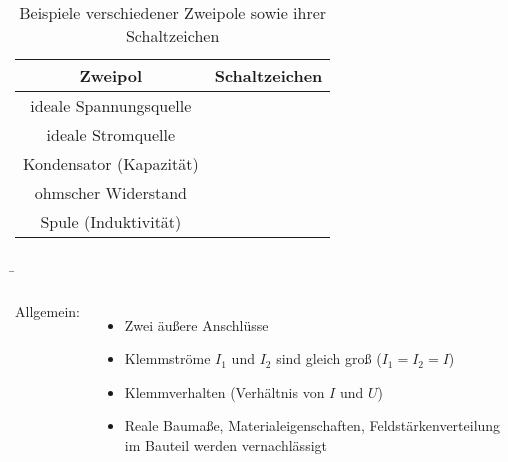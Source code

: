 \begin{frame}
{		\begin{center}
			\begin{table}[h!]
				\centering
				\begin{tabular}{|c|c|}
					\hline
					Zweipol                 & Schaltzeichen                                               \\ \hline
					ideale Spannungsquelle  &  \\ \hline
					ideale Stromquelle      &      \\ \hline
					Kondensator (Kapazität) &             \\ \hline
					ohmscher Widerstand     &     \\ \hline
					Spule (Induktivität)    &                   \\ \hline
				\end{tabular}
				\caption{Beispiele verschiedener Zweipole sowie ihrer Schaltzeichen}
				\label{tab:schaltzeichen}
			\end{table}
		\end{center}
	}
	
	\b{
	
		\begin{columns}
			
			Allgemein:\\
			\phantom{.}\\
			\begin{itemize}
				\item Zwei äußere Anschlüsse
				\item Klemmströme $I_1$ und $I_2$ sind gleich groß ($I_1=I_2 = I$)
				\item Klemmverhalten (Verhältnis von $I$ und $U$)
				\item Reale Baumaße, Materialeigenschaften, Feldstärkenverteilung im Bauteil werden vernachlässigt
			\end{itemize}
			
			
			\vspace{10pt}
			
			
			
		\end{columns}
		
}
\end{frame}
